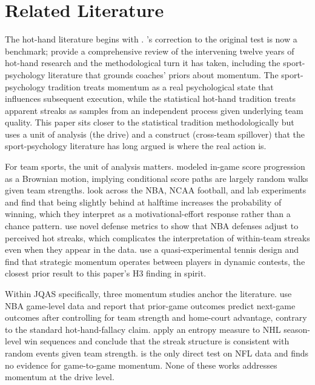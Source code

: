 \documentclass[11pt]{article}
\begin{document}
\section{Related Literature}\label{sec:lit}

The hot-hand literature begins with \citet{gilovich1985hot}.
\citet{miller2018surprised}'s correction to the original test is now a
benchmark; \citet{bareli2006twelve} provide a comprehensive review of the
intervening twelve years of hot-hand research and the methodological turn it
has taken, including the sport-psychology literature that grounds coaches'
priors about momentum. The sport-psychology tradition treats momentum as a
real psychological state that influences subsequent execution, while the
statistical hot-hand tradition treats apparent streaks as samples from an
independent process given underlying team quality. This paper sits closer to
the statistical tradition methodologically but uses a unit of analysis (the
drive) and a construct (cross-team spillover) that the sport-psychology
literature has long argued is where the real action is.

For team sports, the unit of analysis matters. \citet{stern1994probabilities}
modeled in-game score progression as a Brownian motion, implying conditional
score paths are largely random walks given team strengths.
\citet{berger2011hot} look across the NBA, NCAA football, and lab experiments
and find that being slightly behind at halftime increases the probability of
winning, which they interpret as a motivational-effort response rather than
a chance pattern. \citet{csapo2014hand} use novel defense metrics to show
that NBA defenses adjust to perceived hot streaks, which complicates the
interpretation of within-team streaks even when they appear in the data.
\citet{gauriot2019does} use a quasi-experimental tennis design and find that
strategic momentum operates between players in dynamic contests, the closest
prior result to this paper's H3 finding in spirit.

Within JQAS specifically, three momentum studies anchor the literature.
\citet{arkes2011finally} use NBA game-level data and report that prior-game
outcomes predict next-game outcomes after controlling for team strength and
home-court advantage, contrary to the standard hot-hand-fallacy claim.
\citet{steeger2021winning} apply an entropy measure to NHL season-level win
sequences and conclude that the streak structure is consistent with random
events given team strength. \citet{fry2012searching} is the only direct test
on NFL data and finds no evidence for game-to-game momentum. None of these
works addresses momentum at the drive level.
\end{document}
